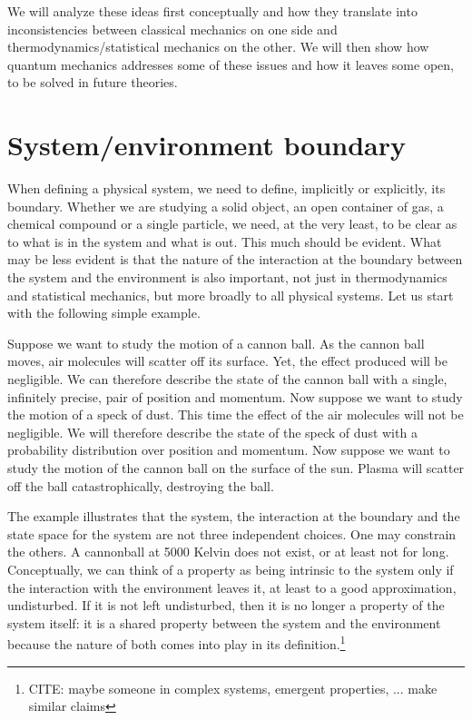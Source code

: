 \documentclass[10pt,twocolumn, nofootinbib]{revtex4-2}
\begin{document}
We will analyze these ideas first conceptually and how they translate into inconsistencies between classical mechanics on one side and thermodynamics/statistical mechanics on the other. We will then show how quantum mechanics addresses some of these issues and how it leaves some open, to be solved in future theories.

\section{System/environment boundary}

When defining a physical system, we need to define, implicitly or explicitly, its boundary. Whether we are studying a solid object, an open container of gas, a chemical compound or a single particle, we need, at the very least, to be clear as to what is in the system and what is out. This much should be evident. What may be less evident is that the nature of the interaction at the boundary between the system and the environment is also important, not just in thermodynamics and statistical mechanics, but more broadly to all physical systems. Let us start with the following simple example.

Suppose we want to study the motion of a cannon ball. As the cannon ball moves, air molecules will scatter off its surface. Yet, the effect produced will be negligible. We can therefore describe the state of the cannon ball with a single, infinitely precise, pair of position and momentum. Now suppose we want to study the motion of a speck of dust. This time the effect of the air molecules will not be negligible. We will therefore describe the state of the speck of dust with a probability distribution over position and momentum. Now suppose we want to study the motion of the cannon ball on the surface of the sun. Plasma will scatter off the ball catastrophically, destroying the ball. 

The example illustrates that the system, the interaction at the boundary and the state space for the system are not three independent choices. One may constrain the others. A cannonball at 5000 Kelvin does not exist, or at least not for long. Conceptually, we can think of a property as being intrinsic to the system only if the interaction with the environment leaves it, at least to a good approximation, undisturbed. If it is not left undisturbed, then it is no longer a property of the system itself: it is a shared property between the system and the environment because the nature of both comes into play in its definition.\footnote{CITE: maybe someone in complex systems, emergent properties, ... make similar claims}
\end{document}
